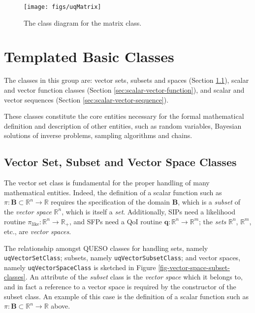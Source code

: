 \begin{figure}[!hp]
\centering
\texttt{[image: figs/uqMatrix]}
\vspace*{-8pt}
\caption{The class diagram for the matrix class.}%
\label{fig-matrix-class}
\end{figure}


\section{Templated Basic Classes}
The classes in this group are: vector sets, subsets and spaces (Section \ref{sec:vector-set-space}), scalar and vector function classes (Section \ref{sec:scalar-vector-function}), and scalar and vector sequences (Section \ref{sec:scalar-vector-sequence}).

These classes constitute the core entities necessary for the formal
mathematical definition and description of other entities, such as
random variables, Bayesian solutions of inverse problems, sampling algorithms and chains.



\subsection{Vector Set, Subset  and Vector Space Classes}\label{sec:vector-set-space}
%
The vector set class is fundamental for the proper handling of many mathematical entities.
Indeed, the definition of a scalar function such as $\pi:\mathbf{B}\subset\mathbb{R}^n\rightarrow\mathbb{R}$ requires the
specification of the domain $\mathbf{B}$, which is a {\it subset} of the {\it vector space} $\mathbb{R}^n$, which is itself a {\it set}. Additionally, 
 SIPs need a likelihood routine $\pi_{\text{like}}:\mathbb{R}^n\rightarrow\mathbb{R}_+$,
and SFPs need a QoI routine $\mathbf{q}:\mathbb{R}^n\rightarrow\mathbb{R}^m$; the \textit{sets} $\mathbb{R}^n$, $\mathbb{R}^m$, etc., are {\it vector spaces}.


The relationship amongst QUESO classes for handling sets, namely \verb+uqVectorSetClass+; subsets, namely \verb+uqVectorSubsetClass+;  and vector spaces, namely \verb+uqVectorSpaceClass+ is sketched in Figure \ref{fig-vector-space-subset-classes}.
%
An attribute of the {\it subset} class is the {\it vector space} which it belongs to, and in fact a reference to a vector space is required by the constructor of the subset class. An example of this case is the definition of a scalar function such as $\pi:\mathbf{B}\subset\mathbb{R}^n\rightarrow\mathbb{R}$ above. %

